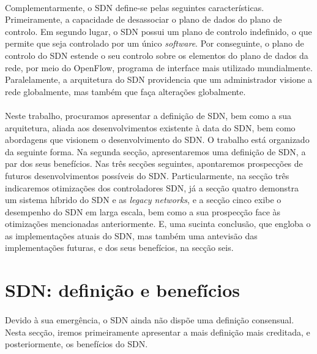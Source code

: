 \documentclass{llncs}
\begin{document}
 \paragraph{}
Complementarmente, o SDN define-se pelas seguintes características. Primeiramente, a capacidade de desassociar o plano de dados do plano de controlo. \cite{paper3}
 Em segundo lugar, o SDN possui um plano de controlo indefinido, o que permite que seja controlado por um único \textit {software}.
 Por conseguinte, o plano de controlo do SDN estende o seu controlo sobre os elementos do plano de dados da rede, por meio do OpenFlow, programa de interface mais utilizado mundialmente.
 Paralelamente, a arquitetura do SDN providencia que um administrador visione a rede globalmente, mas também que faça alterações globalmente.
 \paragraph{}
Neste trabalho, procuramos apresentar a definição de SDN, bem como a sua arquitetura, aliada aos desenvolvimentos existente à data do SDN, bem como abordagens que visionem o desenvolvimento do SDN.
 O trabalho está organizado da seguinte forma. Na segunda secção, apresentaremos uma definição de SDN, a par dos seus benefícios.
 Nas três secções seguintes, apontaremos prospecções de futuros desenvolvimentos possíveis do SDN. 
 Particularmente, na secção três indicaremos otimizações dos controladores SDN, já a secção quatro demonstra um sistema híbrido do SDN e as \textit {legacy networks}, e a secção cinco exibe o desempenho do SDN em larga escala, bem como a sua prospecção face às otimizações mencionadas anteriormente. 
 E, uma sucinta conclusão, que engloba o as implementações atuais do SDN, mas também uma antevisão das implementações futuras, e dos seus benefícios, na secção seis.
 \paragraph{}
\section{SDN: definição e benefícios}
\paragraph{}
Devido à sua emergência, o SDN ainda não dispõe uma definição consensual.
Nesta secção, iremos primeiramente apresentar a mais definição mais creditada, e posteriormente, os benefícios do SDN.
\end{document}

